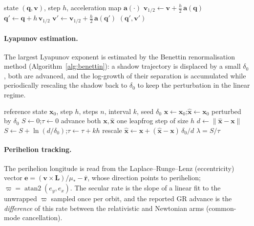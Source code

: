 \documentclass[11pt]{article}
\theoremstyle{definition}
\begin{document}
\begin{algorithm}[h]
\caption{Symplectic leapfrog (velocity Verlet) step}
\label{alg:leapfrog}
\begin{algorithmic}[1]
\Require state $(\mathbf q, \mathbf v)$, step $h$, acceleration map $\mathbf a(\cdot)$
\State $\mathbf v_{1/2} \gets \mathbf v + \tfrac{h}{2}\,\mathbf a(\mathbf q)$
\State $\mathbf q' \gets \mathbf q + h\,\mathbf v_{1/2}$
\State $\mathbf v' \gets \mathbf v_{1/2} + \tfrac{h}{2}\,\mathbf a(\mathbf q')$
\State \Return $(\mathbf q', \mathbf v')$
\end{algorithmic}
\end{algorithm}

\paragraph{Lyapunov estimation.}
The largest Lyapunov exponent is estimated by the Benettin renormalisation
method (Algorithm~\ref{alg:benettin}): a shadow trajectory is displaced by a
small $\delta_0$, both are advanced, and the log-growth of their separation is
accumulated while periodically rescaling the shadow back to $\delta_0$ to keep
the perturbation in the linear regime.

\begin{algorithm}[h]
\caption{Benettin largest-Lyapunov-exponent estimator}
\label{alg:benettin}
\begin{algorithmic}[1]
\Require reference state $\mathbf x_0$, step $h$, steps $n$, interval $k$, seed $\delta_0$
\State $\mathbf x \gets \mathbf x_0$;\quad $\hat{\mathbf x} \gets \mathbf x_0$ perturbed by $\delta_0$
\State $S \gets 0$;\quad $\tau \gets 0$
  \State advance both $\mathbf x,\hat{\mathbf x}$ one leapfrog step of size $h$
    \State $d \gets \lVert \hat{\mathbf x} - \mathbf x \rVert$
    \State $S \gets S + \ln(d/\delta_0)$;\quad $\tau \gets \tau + k h$
    \State rescale $\hat{\mathbf x} \gets \mathbf x + (\hat{\mathbf x}-\mathbf x)\,\delta_0/d$
  \EndIf
\EndFor
\State \Return $\lambda = S/\tau$
\end{algorithmic}
\end{algorithm}

\paragraph{Perihelion tracking.}
The perihelion longitude is read from the Laplace--Runge--Lenz (eccentricity)
vector $\mathbf e = (\mathbf v\times\mathbf L)/\mu_{\!*} - \hat{\mathbf r}$,
whose direction points to perihelion; $\varpi = \operatorname{atan2}(e_y,e_x)$.
The secular rate is the slope of a linear fit to the unwrapped $\varpi$ sampled
once per orbit, and the reported GR advance is the \emph{difference} of this
rate between the relativistic and Newtonian arms (common-mode cancellation).
\end{document}
